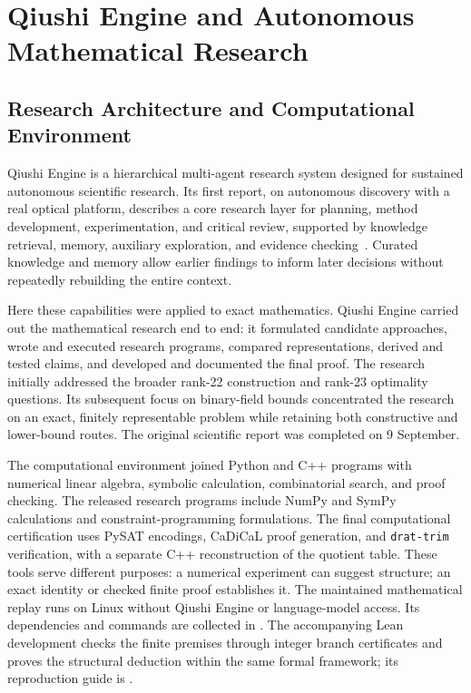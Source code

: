 \section{Qiushi Engine and Autonomous Mathematical Research}\label{sec:research}

\subsection{Research Architecture and Computational Environment}

Qiushi Engine is a hierarchical multi-agent research system designed for
sustained autonomous scientific research. Its first
report, on autonomous discovery with a real optical platform, describes
a core research layer for planning, method development, experimentation,
and critical review, supported by knowledge retrieval, memory, auxiliary
exploration, and evidence checking~\cite{yang2026optical}. Curated knowledge
and memory allow earlier findings to inform later decisions without
repeatedly rebuilding the entire context.

Here these capabilities were applied to exact mathematics. Qiushi Engine
carried out the mathematical research end to end: it formulated candidate
approaches, wrote and executed research programs, compared representations,
derived and tested claims, and developed and documented the final proof.
The research initially addressed the broader rank-22 construction and
rank-23 optimality questions. Its subsequent
focus on binary-field bounds concentrated the research on an exact,
finitely representable problem while retaining both constructive and
lower-bound routes. The original scientific report was completed on 9 September.

The computational environment joined Python and C++ programs with
numerical linear algebra, symbolic calculation, combinatorial search,
and proof checking. The released research programs include NumPy and
SymPy calculations and constraint-programming formulations. The final
computational certification uses PySAT encodings, CaDiCaL proof generation, and
\texttt{drat-trim} verification, with a separate C++ reconstruction of
the quotient table. These tools serve different purposes: a numerical
experiment can suggest structure; an exact identity or checked finite
proof establishes it. The maintained mathematical replay runs on Linux
without Qiushi Engine or language-model access. Its dependencies and
commands are collected in . The accompanying
Lean development checks the finite premises through integer branch
certificates and proves the structural deduction within the same formal
framework; its reproduction guide is .


